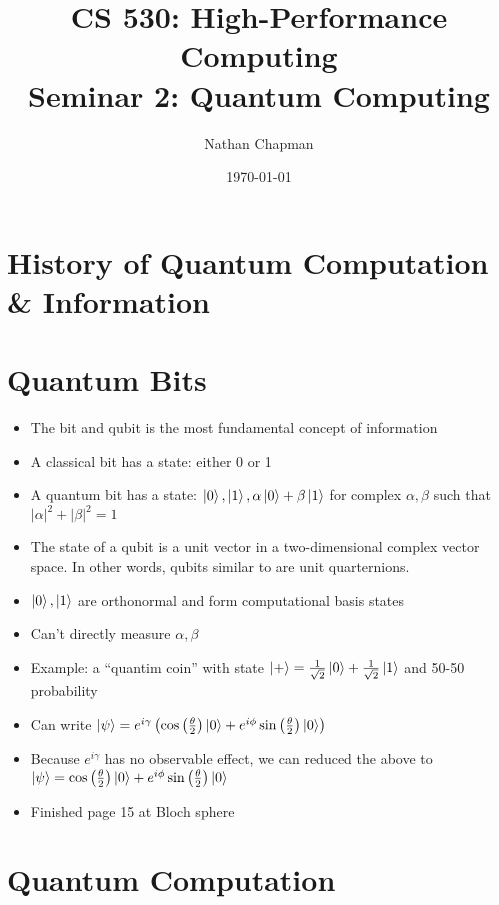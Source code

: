 \documentclass{article}
\title{CS 530: High-Performance Computing \\ Seminar 2: Quantum Computing}
\author{Nathan Chapman}
\affil{Department of Computer Science \\ Central Washington University}
\date{\today}
\begin{document}
\maketitle

\tableofcontents

\section{History of Quantum Computation \& Information}

\section{Quantum Bits}

    \begin{itemize}
        \item The bit and qubit is the most fundamental concept of information
        \item A classical bit has a state: either 0 or 1
        \item A quantum bit   has a state: $\ket{0}, \ket{1}, \alpha \ket{0} + \beta \ket{1}$ for complex $\alpha, \beta$ such that $|\alpha|^2 + |\beta|^2 = 1$
        \item The state of a qubit is a unit vector in a two-dimensional complex vector space.  In other words, qubits similar to are unit quarternions.
        \item $\ket{0}, \ket{1}$ are orthonormal and form computational basis states
        \item Can't directly measure $\alpha, \beta$
        \item Example: a ``quantim coin'' with state $\ket{+} = \frac{1}{\sqrt{2}} \ket{0} + \frac{1}{\sqrt{2}} \ket{1}$ and 50-50 probability
        \item Can write $\ket{\psi} = e^{i \gamma} \left(\cos \left( \frac{\theta}{2} \right) \ket{0} + e^{i \phi} \sin \left( \frac{\theta}{2} \right) \ket{0} \right)$
        \item Because $e^{i \gamma}$ has no observable effect, we can reduced the above to $\ket{\psi} = \cos \left( \frac{\theta}{2} \right) \ket{0} + e^{i \phi} \sin \left( \frac{\theta}{2} \right) \ket{0}$
        \item Finished page 15 at Bloch sphere
    \end{itemize}

\section{Quantum Computation}
\end{document}
